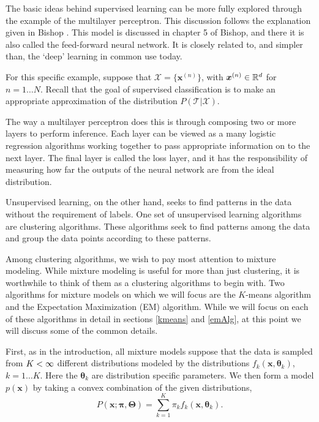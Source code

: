The basic ideas behind supervised learning can be more fully explored through 
the example of the multilayer perceptron.  This discussion follows the explanation given in 
Bishop \cite{BishopBook}. This model is discussed in chapter 5 of Bishop, 
and there it is also called the feed-forward neural network. It is closely 
related to, and simpler than, the `deep' learning in common use today.

For this specific example, suppose that \(\mathcal{X}=\{\bm x^{(n)}\}\), 
with \(\bm x^{(n)}\in \mathbb R^d\) for \(n=1\ldots N\). Recall that the goal of 
supervised classification is to make an appropriate approximation of the 
distribution \(P(\mathcal{T}|\mathcal{X})\). 

The way a multilayer perceptron does this is through composing two or more
layers to perform inference.  Each layer can be viewed as a many logistic 
regression algorithms working together to pass appropriate information on to 
the next layer.  The final layer is called the loss layer, and it has the 
responsibility of measuring how far the outputs of the neural network are
from the ideal distribution.

Unsupervised learning, on the other hand, seeks to find patterns in the data
without the requirement of labels.  One set of unsupervised learning 
algorithms are clustering algorithms.  These algorithms seek to find patterns 
among the data and group the data points according to these patterns. 

Among clustering algorithms, we wish to pay most attention to mixture modeling.
While mixture modeling is useful for more than just clustering, it is 
worthwhile to think of them as a clustering algorithms to begin with.  Two 
algorithms for mixture models on which we will focus are the $K$-means algorithm and the 
Expectation Maximization (EM) algorithm.  While we will focus on each of these 
algorithms in detail in sections \ref{kmeans} and \ref{emAlg}, at this point we will 
discuss some of the common details.

First, as in the introduction, all mixture models suppose that the data is sampled from $K<\infty$ 
different distributions modeled by the distributions 
$f_k(\bm x,\bm \theta_k)$, $k=1\ldots K$. Here the $\bm\theta_k$ are 
distribution specific parameters. We then form a model $p(\bm x)$ by taking a 
convex combination of the given distributions,
\begin{equation}\label{mixProb}
		P(\bm x;\bm\pi,\bm\Theta)=\sum_{k=1}^{K}\pi_kf_k(\bm x,\bm\theta_k).
\end{equation}

